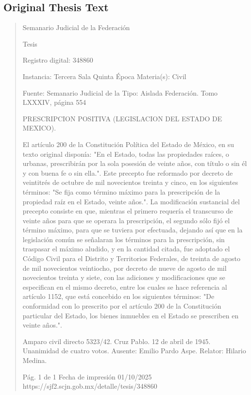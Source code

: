 \documentclass[11pt,a4paper]{article}
\begin{document}
\subsection{Original Thesis Text}

\begin{quote}
                                                   Semanario Judicial de la Federación

                                                  Tesis

 Registro digital: 348860

 Instancia: Tercera Sala          Quinta Época                           Materia(s): Civil

                                  Fuente: Semanario Judicial de la       Tipo: Aislada
                                  Federación.
                                  Tomo LXXXIV, página 554


PRESCRIPCION POSITIVA (LEGISLACION DEL ESTADO DE MEXICO).


El artículo 200 de la Constitución Política del Estado de México, en su texto original disponía: "En el
Estado, todas las propiedades raíces, o urbanas, prescribirán por la sola posesión de veinte años,
con título o sin él y con buena fe o sin ella.". Este precepto fue reformado por decreto de veintitrés
de octubre de mil novecientos treinta y cinco, en los siguientes términos: "Se fija como término
máximo para la prescripción de la propiedad raíz en el Estado, veinte años.". La modificación
sustancial del precepto consiste en que, mientras el primero requería el transcurso de veinte años
para que se operara la prescripción, el segundo sólo fijó el término máximo, para que se tuviera por
efectuada, dejando así que en la legislación común se señalaran los términos para la prescripción,
sin traspasar el máximo aludido, y en la cantidad citada, fue adoptado el Código Civil para el Distrito
y Territorios Federales, de treinta de agosto de mil novecientos veintiocho, por decreto de nueve de
agosto de mil novecientos treinta y siete, con las adiciones y modificaciones que se especifican en
el mismo decreto, entre los cuales se hace referencia al artículo 1152, que está concebido en los
siguientes términos: "De conformidad con lo prescrito por el artículo 200 de la Constitución particular
del Estado, los bienes inmuebles en el Estado se prescriben en veinte años.".


Amparo civil directo 5323/42. Cruz Pablo. 12 de abril de 1945. Unanimidad de cuatro votos.
Ausente: Emilio Pardo Aspe. Relator: Hilario Medina.




                                             Pág. 1 de 1              Fecha de impresión 01/10/2025
  https://sjf2.scjn.gob.mx/detalle/tesis/348860

\end{quote}
\end{document}
